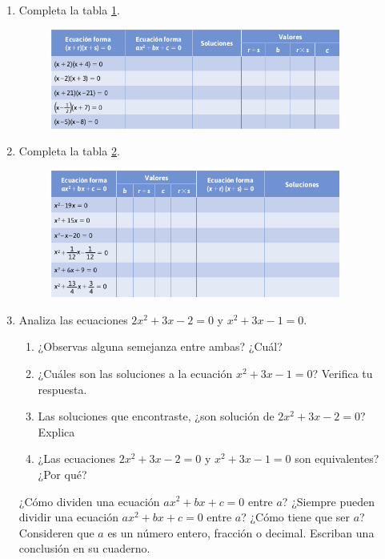 \documentclass[11pt]{book}
\begin{document}
\begin{enumerate}
  \item Completa la tabla \ref{tab:table2.7}.

        \begin{figure}[H]
          \centering
          \includegraphics[width=0.9\textwidth]{table2.7.png}
          \label{tab:table2.7}
        \end{figure}

  \item Completa la tabla \ref{tab:table2.8}.

        \begin{figure}[H]
          \centering
          \includegraphics[width=0.9\textwidth]{table2.8.png}
          \label{tab:table2.8}
        \end{figure}

  \item Analiza las ecuaciones $2x^2 + 3x - 2 = 0$ y $x^2 + 3 x - 1 = 0$.
        \begin{enumerate}
          \item ¿Observas alguna semejanza entre ambas? ¿Cuál?
          \item ¿Cuáles son las soluciones a la ecuación $x^2 + 3 x - 1 = 0$? Verifica tu respuesta.
          \item Las soluciones que encontraste, ¿son solución de $2x^2 + 3x - 2 = 0$? Explica
          \item ¿Las ecuaciones $2x^2 + 3x - 2 = 0$ y $x^2 + 3 x - 1 = 0$ son equivalentes? ¿Por qué?
        \end{enumerate}
        ¿Cómo dividen una ecuación $ax^2 + bx + c = 0$ entre $a$? ¿Siempre pueden dividir una ecuación
        $ax^2 + bx + c = 0$ entre $a$? ¿Cómo tiene que ser $a$? Consideren que $a$ es un número
        entero, fracción o decimal. Escriban una conclusión en su cuaderno.


\end{enumerate}
\end{document}
